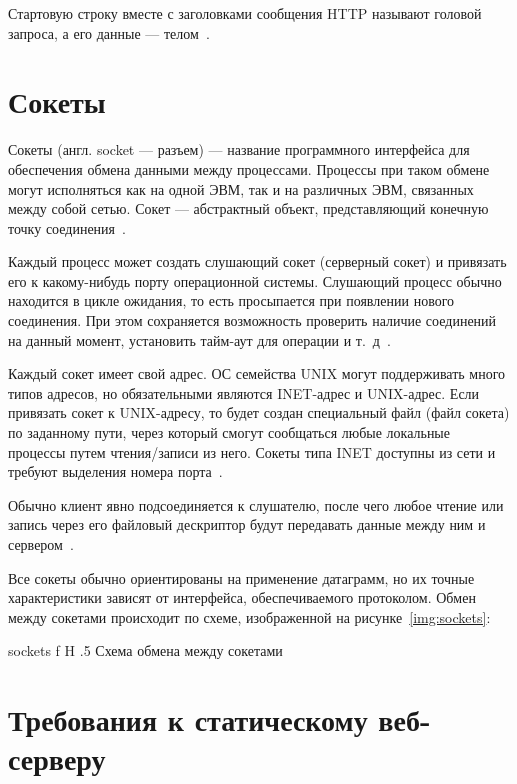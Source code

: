 \documentclass{bmstu}
\begin{document}
Стартовую строку вместе с заголовками сообщения HTTP называют головой запроса, а его данные --- телом~\cite{MdnHttpMsg2023}.

\section{Сокеты}

Сокеты (англ. socket --- разъем) --- название программного интерфейса для обеспечения обмена данными между процессами. 
Процессы при таком обмене могут исполняться как на одной ЭВМ, так и на различных ЭВМ, связанных между собой сетью. 
Сокет --- абстрактный объект, представляющий конечную точку соединения~\cite{Sockets2020}.

Каждый процесс может создать слушающий сокет (серверный сокет) и привязать его к какому-нибудь порту операционной системы. 
Слушающий процесс обычно находится в цикле ожидания, то есть просыпается при появлении нового соединения. 
При этом сохраняется возможность проверить наличие соединений на данный момент, установить тайм-аут для операции и т.~д~\cite{Sockets2020}.

Каждый сокет имеет свой адрес. 
ОС семейства UNIX могут поддерживать много типов адресов, но обязательными являются INET-адрес и UNIX-адрес. 
Если привязать сокет к UNIX-адресу, то будет создан специальный файл (файл сокета) по заданному пути, через который смогут сообщаться любые локальные процессы путем чтения/записи из него. 
Сокеты типа INET доступны из сети и требуют выделения номера порта~\cite{Sockets2020}.

Обычно клиент явно подсоединяется к слушателю, после чего любое чтение или запись через его файловый дескриптор будут передавать данные между ним и сервером~\cite{Sockets2020}.

Все сокеты обычно ориентированы на применение датаграмм, но их точные характеристики зависят от интерфейса, обеспечиваемого протоколом. 
Обмен между сокетами происходит по схеме, изображенной на рисунке~\ref{img:sockets}:

    {sockets}
    {f}
    {H}
    {.5\textwidth}
    {Схема обмена между сокетами}

\section{Требования к статическому веб-серверу}
\end{document}
